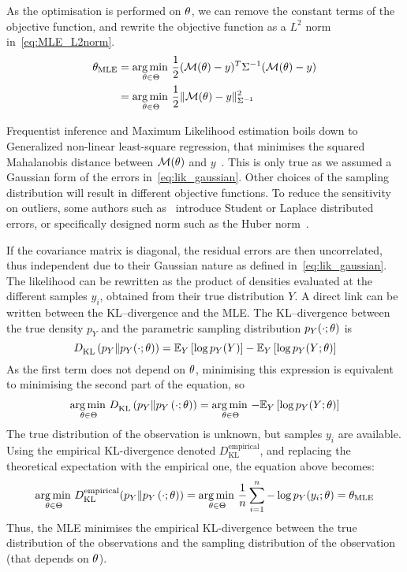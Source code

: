 \documentclass[../../Main_ManuscritThese.tex]{subfiles}
\begin{document}
  As the optimisation is performed on $\theta$, we can remove the
  constant terms of the objective function, and rewrite the objective
  function as a $L^2$ norm
  in~\cref{eq:MLE_L2norm}.  %
  \begin{align}
    {\theta}_{\mathrm{MLE}} &= \operatorname*{arg\,min \,}_{\theta \in \Theta}\frac{1}{2}(\mathcal{M}(\theta) - y)^T\Sigma^{-1}(\mathcal{M}(\theta) - y) \nonumber\\
                           &= \operatorname*{arg\,min \,}_{\theta \in \Theta}\frac12 \| \mathcal{M}(\theta) - y \|^2_{\Sigma^{-1}} \label{eq:MLE_L2norm}
  \end{align}

  Frequentist inference and Maximum Likelihood estimation boils down
  to Generalized non-linear least-square regression, that minimises
  the squared Mahalanobis distance between $\mathcal{M}({\theta})$ and
  $y$~\citep{mahalanobis_generalized_1936}. This is only true as we assumed a Gaussian form of the errors
  in~\cref{eq:lik_gaussian}. Other choices of the sampling
  distribution will result in different
  objective functions. To reduce the sensitivity on outliers, some
  authors such as~\cite{rao_robust_2015} introduce Student or Laplace
  distributed errors, or specifically designed norm such as the Huber
  norm~\citep{huber_robust_2011}.

  If the covariance matrix is diagonal, the residual errors are then
  uncorrelated, thus independent due to their Gaussian nature as
  defined in~\cref{eq:lik_gaussian}. The likelihood can be rewritten
  as the product of densities evaluated at the different samples
  $y_i$, obtained from their true distribution $Y$.  A direct link can
  be written between the KL--divergence and the MLE. The
  KL--divergence between the true density $p_Y$ and the parametric
  sampling distribution $p_Y(\cdot;\theta)$ is
  \begin{equation}
  D^{\mathrm{}}_{\mathrm{KL}}\left(p_Y \| p_Y(\cdot;\theta)\right) = \mathbb{E}_Y\left[\log p_Y(Y)\right]-\mathbb{E}_Y\left[\log p_Y(Y;\theta)\right]  
\end{equation}
As the first term does not depend on $\theta$, minimising this expression
is equivalent to minimising the second part of the equation, so
\begin{align}
 \operatorname*{arg\,min \,}_{\theta \in\Theta} D^{\mathrm{}}_{\mathrm{KL}}\left(p_Y \| p_Y\left(\cdot;\theta \right)\right) = \operatorname*{arg\,min \,}_{\theta \in \Theta} -\mathbb{E}_{Y}\left[\log p_{Y}(Y ; \theta)\right]
\end{align}
The true distribution of the observation is unknown, but samples $y_i$
are available. Using the empirical KL-divergence denoted
$D^{\mathrm{empirical}}_{\mathrm{KL}}$, and replacing the theoretical
expectation with the empirical one, the equation above becomes:
\begin{equation}
  \operatorname*{arg\,min \,}_{\theta \in\Theta} D^{\mathrm{empirical}}_{\mathrm{KL}}(p_Y \| p_Y\left(\cdot;\theta \right)) = \operatorname*{arg\,min \,}_{\theta \in\Theta} \frac{1}{n} \sum_{i=1}^n - \log p_Y(y_i;\theta) = {\theta}_{\mathrm{MLE}}
\end{equation}
Thus, the MLE minimises the empirical KL-divergence between the true
distribution of the observations and the sampling distribution of the
observation (that depends on $\theta$).
\end{document}

